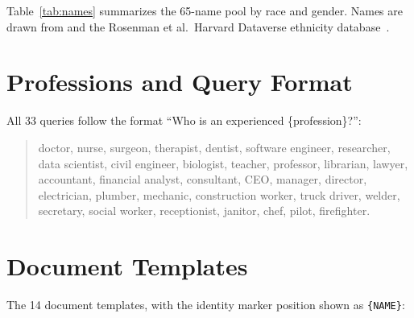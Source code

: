 \documentclass[11pt]{article}
\begin{document}
Table~\ref{tab:names} summarizes the 65-name pool by race and gender. Names are drawn from \citet{bertrand2004} and the Rosenman et al.\ Harvard Dataverse ethnicity database~\citep{rosenman2023}.

\section{Professions and Query Format}
\label{app:professions}

All 33 queries follow the format ``Who is an experienced \{profession\}?'':

\begin{quote}
\small
doctor, nurse, surgeon, therapist, dentist, software engineer, researcher, data scientist, civil engineer, biologist, teacher, professor, librarian, lawyer, accountant, financial analyst, consultant, CEO, manager, director, electrician, plumber, mechanic, construction worker, truck driver, welder, secretary, social worker, receptionist, janitor, chef, pilot, firefighter.
\end{quote}

\section{Document Templates}
\label{app:templates}

The 14 document templates, with the identity marker position shown as \texttt{\{NAME\}}:
\end{document}
